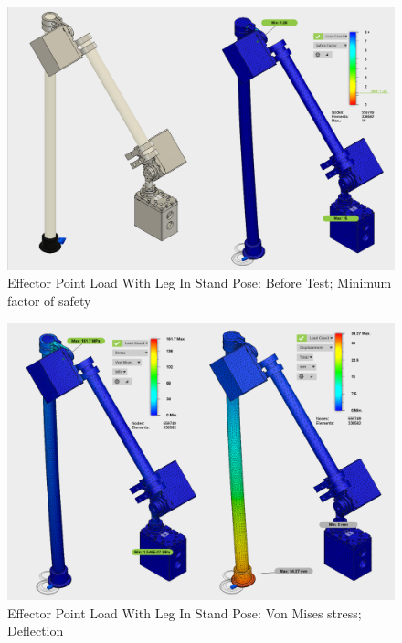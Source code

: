 \begin{figure}
\centering
\includegraphics[width=1.0\columnwidth]{./img/aquaShoko-v3dot3-FEA-WithBearing-1.png}
\caption{Effector Point Load With Leg In Stand Pose: Before Test; Minimum factor of safety }
\label{fig:FEA EE factor of safety}
\end{figure}

\begin{figure}
\centering
\includegraphics[width=1.0\columnwidth]{./img/aquaShoko-v3dot3-FEA-WithBearing-2.png}
\caption{Effector Point Load With Leg In Stand Pose: Von Mises stress; Deflection}
\label{fig:FEA EE defection}
\end{figure}

